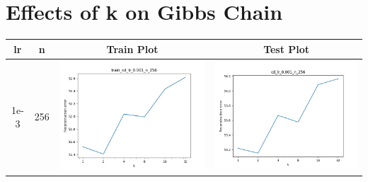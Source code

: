\documentclass[12pt]{report}
\begin{document}
\section{Effects of k on Gibbs Chain}
\begin{table}[H]
  \centering
  \begin{tabular}{ | c | c | c | c |}
    \hline
    \textbf{lr} & \textbf{n} & \textbf{Train Plot} & \textbf{Test Plot} \\ \hline
    1e-3 & 256 &
    \begin{minipage}{.3\textwidth}
    \includegraphics[scale=0.25]{train_cd_lr_0_001_n_256.png}
    \end{minipage} &
    \begin{minipage}{.3\textwidth}
      \includegraphics[scale=0.25]{cd_lr_0_001_n_256.png}

\end{minipage}
\end{tabular}
\end{table}
\end{document}
